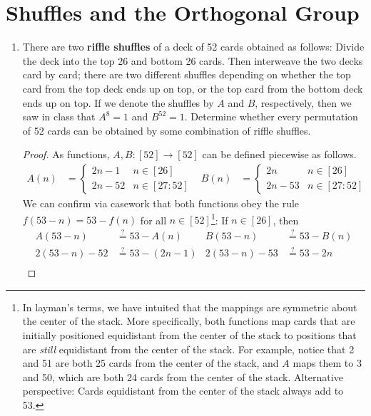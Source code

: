 \documentclass[../psets.tex]{subfiles}
\begin{document}
\section{Shuffles and the Orthogonal Group}
\begin{enumerate}
    \item {}There are two \textbf{riffle shuffles} of a deck of 52 cards obtained as follows: Divide the deck into the top 26 and bottom 26 cards. Then interweave the two decks card by card; there are two different shuffles depending on whether the top card from the top deck ends up on top, or the top card from the bottom deck ends up on top. If we denote the shuffles by $A$ and $B$, respectively, then we saw in class that $A^8=1$ and $B^{52}=1$. Determine whether every permutation of 52 cards can be obtained by some combination of riffle shuffles.
    \begin{proof}
        As functions, $A,B:[52]\to[52]$ can be defined piecewise as follows.
        \begin{align*}
            A(n) &=
            \begin{cases}
                2n-1 & n\in[26]\\
                2n-52 & n\in[27:52]
            \end{cases}&
            B(n) &=
            \begin{cases}
                2n & n\in[26]\\
                2n-53 & n\in[27:52]
            \end{cases}
        \end{align*}
        We can confirm via casework that both functions obey the rule $f(53-n)=53-f(n)$ for all $n\in[52]$\footnote{In layman's terms, we have intuited that the mappings are symmetric about the center of the stack. More specifically, both functions map cards that are initially positioned equidistant from the center of the stack to positions that are \emph{still} equidistant from the center of the stack. For example, notice that 2 and 51 are both 25 cards from the center of the stack, and $A$ maps them to 3 and 50, which are both 24 cards from the center of the stack. Alternative perspective: Cards equidistant from the center of the stack always add to 53.}: If $n\in[26]$, then
        \begin{align*}
            A(53-n) &\stackrel{?}{=} 53-A(n)&
                B(53-n) &\stackrel{?}{=} 53-B(n)\\
            2(53-n)-52 &\stackrel{?}{=} 53-(2n-1)&
                2(53-n)-53 &\stackrel{?}{=} 53-2n\\

\end{align*}
\end{proof}
\end{enumerate}
\end{document}
